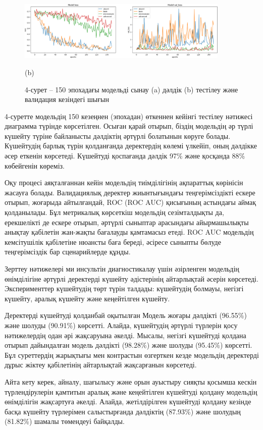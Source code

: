 \begin{figure}[H]
	\centering
	\includegraphics[width=0.9\textwidth]{assets/5}
	\caption*{(b)}
	\caption*{4-сурет -- 150 эпохадағы модельді сынау (a) дәлдік (b) тестілеу және валидация кезіндегі шығын}
\end{figure}

\begin{multicols}{2}
4-суретте модельдің 150 кезеңнен (эпохадан) өткеннен кейінгі тестілеу
нәтижесі диаграмма түрінде көрсетілген. Осыған қарай отырып, біздің
модельдің әр түрлі күшейту түріне байланысты дәлдіктің әртүрлі болатынын
көруге болады. Күшейтудің барлық түрін қолданғанда деректердің көлемі
үлкейіп, оның дәлдікке әсер еткенін көрсетеді. Күшейтуді қоспағанда
дәлдік 97\% және қосқанда 88\% көбейгенін көреміз.

Оқу процесі аяқталғаннан кейін модельдің тиімділігінің ақпараттық
көрінісін жасауға болады. Валидациялық деректер жиынтығындағы
теңгерімсіздікті ескере отырып, жоғарыда айтылғандай, ROC (ROC AUC)
қисығының астындағы аймақ қолданылады. Бұл метрикалық көрсеткіш
модельдің сезімталдықты да, ерекшелікті де ескере отырып, әртүрлі
сыныптар арасындағы айырмашылықты анықтау қабілетін жан-жақты бағалауды
қамтамасыз етеді. ROC AUC модельдің кемсітушілік қабілетіне нюансты баға
береді, әсіресе сыныпты бөлуде теңгерімсіздік бар сценарийлерде құнды.

Зерттеу нәтижелері ми инсультін диагностикалау үшін әзірленген модельдің
өнімділігіне әртүрлі деректерді күшейту әдістерінің айтарлықтай әсерін
көрсетеді. Эксперименттер күшейтудің төрт түрін талдады: күшейтудің
болмауы, негізгі күшейту, аралық күшейту және кеңейтілген күшейту.

Деректерді күшейтуді қолданбай оқытылған Модель жоғары дәлдікті
(96.55\%) және шолуды (90.91\%) көрсетті. Алайда, күшейтудің әртүрлі
түрлерін қосу нәтижелердің одан әрі жақсаруына әкелді. Мысалы, негізгі
күшейтуді қолдана отырып дайындалған модель дәлдікті (98.28\%) және
шолуды (95.45\%) көрсетті. Бұл суреттердің жарықтығы мен контрастын
өзгерткен кезде модельдің деректерді дұрыс жіктеу қабілетінің
айтарлықтай жақсарғанын көрсетеді.

Айта кету керек, айналу, шағылысу және орын ауыстыру сияқты қосымша
кескін түрлендірулерін қамтитын аралық және кеңейтілген күшейтуді
қолдану модельдің өнімділігін жақсартуға әкелді. Алайда, жетілдірілген
күшейтуді қолдану кезінде басқа күшейту түрлерімен салыстырғанда
дәлдіктің (87.93\%) және шолудың (81.82\%) шамалы төмендеуі байқалды.


\end{multicols}
